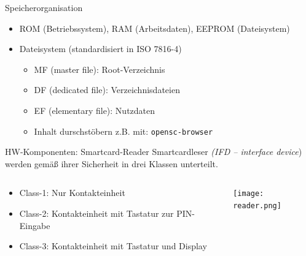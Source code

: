 \documentclass{beamer}
\begin{document}
\begin{frame}[fragile]{Speicherorganisation}
\begin{minipage}[t][\textheight][t]{\linewidth}
\begin{itemize}
  \item ROM (Betriebssystem), RAM (Arbeitsdaten), EEPROM (Dateisystem)
  \item Dateisystem (standardisiert in ISO 7816-4)
  \begin{itemize}
    \item MF (master file): Root-Verzeichnis
    \item DF (dedicated file): Verzeichnisdateien
    \item EF (elementary file): Nutzdaten
    \item Inhalt durschstöbern z.B. mit: \lstinline|opensc-browser|
  \end{itemize}
\end{itemize}
\end{minipage}
\end{frame}

\begin{frame}{HW-Komponenten: Smartcard-Reader}
Smartcardleser \emph{(IFD -- interface device}) werden gemäß
ihrer Sicherheit in drei Klassen unterteilt.
\vspace{10mm}
\begin{columns}
\begin{column}{0.5\textwidth}
\begin{minipage}[t][\textheight][t]{\linewidth}
\begin{itemize}
  \item Class-1: Nur Kontakteinheit
  \item Class-2: Kontakteinheit mit Tastatur zur PIN-Eingabe
  \item Class-3: Kontakteinheit mit Tastatur und Display
\end{itemize}
\end{minipage}
\end{column}
\begin{column}{0.5\textwidth}
\begin{minipage}[t][\textheight][t]{\linewidth}
\texttt{[image: reader.png]}
\end{minipage}
\end{column}
\end{columns}
\end{frame}
\end{document}
